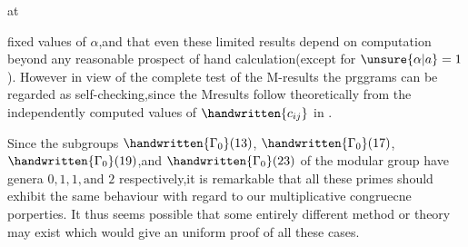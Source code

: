 \begin{flushright}
at 
\end{flushright}

\noindent fixed values of $\alpha$,and that even these limited results depend on computation beyond any reasonable prospect of hand calculation(except for $\unsure{\alpha|a}=1$). However in view of the complete test of the M-results the prggrams can be regarded as self-checking,since the M\inserted{\handwritten{-}}results follow theoretically from the independently computed values of $\handwritten{c_{ij}}$ in  .

Since the subgroups $\handwritten{\Gamma_{0}}(13)$, $\handwritten{\Gamma_{0}}(17)$, $\handwritten{\Gamma_{0}}(19)$,and $\handwritten{\Gamma_{0}}(23)$ of the modular group have genera $0,1,1,\text{and }2$ respectively,it is remarkable that all these primes should exhibit the same behaviour with regard to our multiplicative congruecne porperties. It thus seems possible that some entirely different method or theory may exist which would give an uniform proof of all these cases.

